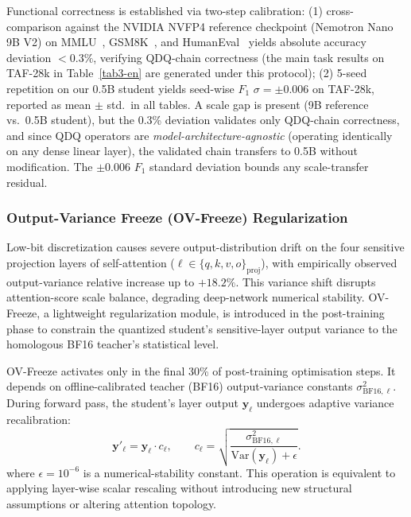 \documentclass[11pt, a4paper]{article}
\begin{document}
Functional correctness is established via two-step calibration: (1) cross-comparison against the NVIDIA NVFP4 reference checkpoint (Nemotron Nano 9B V2) on MMLU~\cite{30}, GSM8K~\cite{31}, and HumanEval~\cite{32} yields absolute accuracy deviation $<0.3\%$, verifying QDQ-chain correctness (the main task results on TAF-28k in Table~\ref{tab3-en} are generated under this protocol); (2) 5-seed repetition on our 0.5B student yields seed-wise $F_1$ $\sigma = \pm 0.006$ on TAF-28k, reported as mean $\pm$ std.\ in all tables. A scale gap is present (9B reference vs.\ 0.5B student), but the 0.3\% deviation validates only QDQ-chain correctness, and since QDQ operators are \emph{model-architecture-agnostic} (operating identically on any dense linear layer), the validated chain transfers to 0.5B without modification. The $\pm 0.006$ $F_1$ standard deviation bounds any scale-transfer residual.

\subsubsection{Output-Variance Freeze (OV-Freeze) Regularization}

Low-bit discretization causes severe output-distribution drift on the four sensitive projection layers of self-attention ($\ell \in \{q, k, v, o\}_{\mathrm{proj}}$), with empirically observed output-variance relative increase up to $+18.2\%$. This variance shift disrupts attention-score scale balance, degrading deep-network numerical stability. OV-Freeze, a lightweight regularization module, is introduced in the post-training phase to constrain the quantized student's sensitive-layer output variance to the homologous BF16 teacher's statistical level.

OV-Freeze activates only in the final 30\% of post-training optimisation steps. It depends on offline-calibrated teacher (BF16) output-variance constants $\sigma^2_{\mathrm{BF16},\ell}$. During forward pass, the student's layer output $\bm{y}_\ell$ undergoes adaptive variance recalibration:
\begin{equation}
\label{eq:ovf-rescale-en}
\bm{y}'_\ell = \bm{y}_\ell\cdot c_\ell, \qquad c_\ell = \sqrt{\frac{\sigma^2_{\mathrm{BF16},\ell}}{\mathrm{Var}(\bm{y}_\ell) + \epsilon}}.
\end{equation}
where $\epsilon = 10^{-6}$ is a numerical-stability constant. This operation is equivalent to applying layer-wise scalar rescaling without introducing new structural assumptions or altering attention topology.
\end{document}
